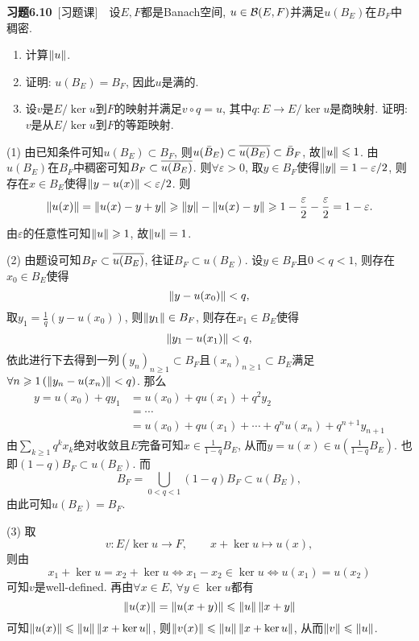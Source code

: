 	\textbf{习题6.10}\ [习题课]\ \ 设$ E, F $都是Banach空间, $ u\in\CB(E,F) $并满足$ u(B_E) $在$ B_F $中稠密.
	\begin{enumerate}[(1)]
	\item 计算$ \norm{u} $.
	\item 证明: $ u(B_E)=B_F $, 因此$ u $是满的.
	\item 设$ v $是$ E/\ker u $到$ F $的映射并满足$ v\circ q=u $, 其中$ q : E\to E/\ker u $是商映射. 证明: $ v $是从$ E/\ker u $到$ F $的等距映射.
	\end{enumerate}
	\begin{Proof}
	(1) 由已知条件可知$ u(B_E)\subset B_F $, 则$ u(\bar{B}_E)\subset\baro{u(B_E)}\subset \bar{B}_F $, 故$ \norm{u}\leqslant 1 $. 由$ u(B_E) $在$ B_F $中稠密可知$ B_F\subset\baro{u(B_E)} $. 则$ \forall\varepsilon>0 $, 取$ y\in B_F $使得$ \norm{y}=1-\varepsilon/2 $, 则存在$ x\in B_E $使得$ \norm{y-u(x)}<\varepsilon/2 $. 则
	\[
	\norm{u(x)}=\norm{u(x)-y+y}\geqslant\norm{y}-\norm{u(x)-y}\geqslant 1-\frac{\varepsilon}{2}-\frac{\varepsilon}{2}=1-\varepsilon.
	\]
	由$ \varepsilon $的任意性可知$ \norm{u}\geqslant 1 $, 故$ \norm{u}=1 $.
	
	(2) 由题设可知$ B_F\subset\baro{u(B_E)} $, 往证$ B_F\subset u(B_E) $. 设$ y\in B_F $且$ 0<q<1 $, 则存在$ x_0\in B_E $使得
	\[
	\norm{y-u(x_0)}<q,
	\]
	取$ y_1=\frac{1}{q}(y-u(x_0)) $, 则$ \norm{y_1}\in B_F $, 则存在$ x_1\in B_E $使得
	\[
	\norm{y_1-u(x_1)}<q,
	\]
	依此进行下去得到一列$ (y_n)_{n\geqslant 1}\subset B_F $且$ (x_n)_{n\geqslant 1}\subset B_E $满足$ \forall n\geqslant 1\,(\norm{y_n-u(x_n)}<q) $. 那么
	\[
	\begin{aligned}
	y=u(x_0)+qy_1&=u(x_0)+qu(x_1)+q^2y_2\\
	&=\cdots\\
	&=u(x_0)+qu(x_1)+\cdots+q^nu(x_n)+q^{n+1}y_{n+1}
	\end{aligned}
	\]
	由$ \sum\limits_{k\geqslant 1}q^kx_k $绝对收敛且$ E $完备可知$ x\in\frac{1}{1-q}B_E $, 从而$ y=u(x)\in u\left( \frac{1}{1-q}B_E \right) $. 也即$ (1-q)B_F\subset u(B_E) $. 而
	\[
	B_F=\bigcup_{0<q<1}(1-q)B_F\subset u(B_E),
	\]
	由此可知$ u(B_E)=B_F $.
	
	(3) 取
	\[
	v : E/\ker u\to F,\qquad x+\ker u\mapsto u(x),
	\]
	则由
	\[
	x_1+\ker u=x_2+\ker u\Longleftrightarrow x_1-x_2\in\ker u\Longleftrightarrow u(x_1)=u(x_2)
	\]
	可知$ v $是well-defined. 再由$ \forall x\in E $, $ \forall y\in\ker u $都有
	\[
	\norm{u(x)}=\norm{u(x+y)}\leqslant\norm{u}\norm{x+y}
	\]
	可知$ \norm{u(x)}\leqslant\norm{u}\norm{x+\ker u} $, 则$ \norm{v(x)}\leqslant\norm{u}\norm{x+\ker u} $, 从而$ \norm{v}\leqslant\norm{u} $.
	

\end{Proof}
